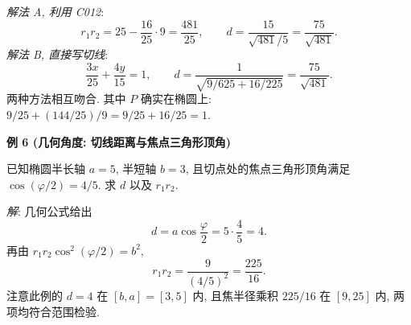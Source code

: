 \begin{examplebox}
\textit{解法 A, 利用 C012}:
\[
r_1r_2=25-\frac{16}{25}\cdot 9=\frac{481}{25},
\qquad
\boxed{d=\frac{15}{\sqrt{481}/5}=\frac{75}{\sqrt{481}}}.
\]
\textit{解法 B, 直接写切线}:
\[
\frac{3x}{25}+\frac{4y}{15}=1,
\qquad
 d=\frac1{\sqrt{9/625+16/225}}
=\frac{75}{\sqrt{481}}.
\]
两种方法相互吻合. 其中 $P$ 确实在椭圆上:
$9/25+(144/25)/9=9/25+16/25=1$.

\medskip
\textbf{例 6 (几何角度: 切线距离与焦点三角形顶角)}

已知椭圆半长轴 $a=5$, 半短轴 $b=3$,
且切点处的焦点三角形顶角满足 $\cos(\varphi/2)=4/5$.
求 $d$ 以及 $r_1r_2$.

\textit{解}: 几何公式给出
\[
d=a\cos\frac\varphi2=5\cdot\frac45=\boxed{4}.
\]
再由 $r_1r_2\cos^2(\varphi/2)=b^2$,
\[
r_1r_2=\frac9{(4/5)^2}=\boxed{\frac{225}{16}}.
\]
注意此例的 $d=4$ 在 $[b,a]=[3,5]$ 内, 且焦半径乘积
$225/16$ 在 $[9,25]$ 内, 两项均符合范围检验.
\end{examplebox}
